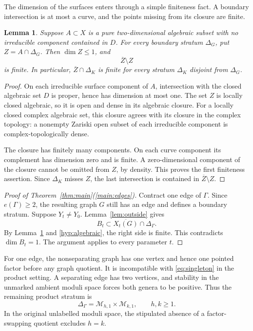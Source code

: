 \documentclass[11pt]{article}
\newcommand{\M}{\mathcal M}
\newcommand{\cl}[1]{\overline{#1}}
\newtheorem{lemma}[theorem]{Lemma}
\theoremstyle{definition}
\theoremstyle{remark}
\begin{document}
The dimension of the surfaces enters through a simple finiteness fact. A boundary intersection is at most a curve, and the points missing from its closure are finite.

\begin{lemma}\label{lem:frontier}
Suppose $A\subset X$ is a pure two-dimensional algebraic subset with no irreducible component contained in $D$. For every boundary stratum $\Delta_G$, put $Z=A\cap\Delta_G$. Then $\dim Z\leq1$, and
\[
 \cl Z\setminus Z
\]
is finite. In particular, $\cl Z\cap\Delta_K$ is finite for every stratum $\Delta_K$ disjoint from $\Delta_G$.
\end{lemma}

\begin{proof}
On each irreducible surface component of $A$, intersection with the closed algebraic set $D$ is proper, hence has dimension at most one. The set $Z$ is locally closed algebraic, so it is open and dense in its algebraic closure. For a locally closed complex algebraic set, this closure agrees with its closure in the complex topology: a nonempty Zariski open subset of each irreducible component is complex-topologically dense.

The closure has finitely many components. On each curve component its complement has dimension zero and is finite. A zero-dimensional component of the closure cannot be omitted from $Z$, by density. This proves the first finiteness assertion. Since $\Delta_K$ misses $Z$, the last intersection is contained in $\cl Z\setminus Z$.
\end{proof}

\begin{proof}[Proof of Theorem~\ref{thm:main}(\ref{main:edges})]
Contract one edge of $\Gamma$. Since $e(\Gamma)\geq2$, the resulting graph $G$ still has an edge and defines a boundary stratum. Suppose $Y_t\ne Y_0$. Lemma~\ref{lem:outside} gives
\[
 B_t\subset\cl{X_t(G)}\cap\Delta_\Gamma.
\]
By Lemma~\ref{lem:frontier} and \eqref{hyp:algebraic}, the right side is finite. This contradicts $\dim B_t=1$. The argument applies to every parameter $t$.
\end{proof}


For one edge, the nonseparating graph has one vertex and hence one pointed factor before any graph quotient. It is incompatible with \eqref{eq:singleton} in the product setting. A separating edge has two vertices, and stability in the unmarked ambient moduli space forces both genera to be positive. Thus the remaining product stratum is
\begin{equation}\label{eq:separating}
 \Delta_\Gamma=\M_{h,1}\times\M_{k,1},\qquad h,k\geq1.
\end{equation}
In the original unlabelled moduli space, the stipulated absence of a factor-swapping quotient excludes $h=k$.
\end{document}
